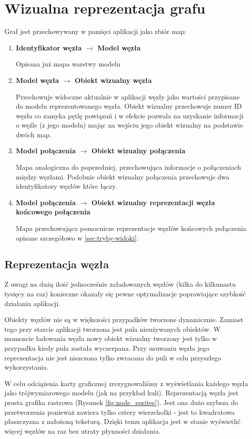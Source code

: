 \section{Wizualna reprezentacja grafu}
\label{sec:graf-reprezentacja}

\newcommand\mapitem[3]{
	\item \textbf{#1 $\to$ #2}

	#3
}

\noindent
Graf jest przechowywany w pamięci aplikacji jako zbiór map:
\begin{enumerate}[label=\textbullet]
	\mapitem{Identyfikator węzła}{Model węzła}{Opisana już mapa warstwy modelu}
	\mapitem{Model węzła}{Obiekt wizualny węzła}{Przechowuje widoczne aktualnie w aplikacji węzły jako wartości przypisane do modelu reprezentowanego węzła. Obiekt wizualny przechowuje numer ID węzła co zamyka pętlę powiązań i w efekcie pozwala na uzyskanie informacji o węźle (z jego modelu) mając na wejściu jego obiekt wizualny na podstawie dwóch map.}
	\mapitem{Model połączenia}{Obiekt wizualny połączenia}{Mapa analogiczna do poprzedniej, przechowująca informacje o połączeniach między węzłami. Podobnie obiekt wizualny połączenia przechowuje dwa identyfikatory węzłów które łączy.}
	
	\mapitem{Model połączenia}{Obiekt wizualny reprezentacji węzła końcowego połączenia}{Mapa przechowująca pomocnicze reprezentacje węzłów końcowych połączenia opisane szczegółowo w \ref{sec:tryby-widoki}.}
\end{enumerate}

\subsection{Reprezentacja węzła} Z uwagi na dużą ilość jednocześnie załadowanych węzłów (kilka do kilkunastu tysięcy na raz) konieczne okazały się pewne optymalizacje poprawiające szybkość działania aplikacji. 

Obiekty węzłów nie są w większości przypadków tworzone dynamicznie. Zamiast tego przy starcie aplikacji tworzona jest pula nieużywanych obiektów. W momencie ładowania węzła nowy obiekt wizualny tworzony jest tylko w przypadku kiedy pula została wyczerpana. Przy usuwaniu węzła jego reprezentacja nie jest niszczona tylko zwracana do puli w celu przyszłego wykorzystania.

W celu odciążenia karty graficznej zrezygnowaliśmy z wyświetlania każdego węzła jako trójwymiarowego modelu (jak na przykład kuli). Reprezentacją węzła jest prosta grafika rastrowa (Rysunek \ref{fig:node_sprites}). Jest ona dużo szybsza do przetworzenia ponieważ zawiera tylko cztery wierzchołki - jest to kwadratowa płaszczyzna z nałożoną teksturą. Dzięki temu aplikacja jest w stanie wyświetlić więcej węzłów na raz bez utraty płynności działania.

